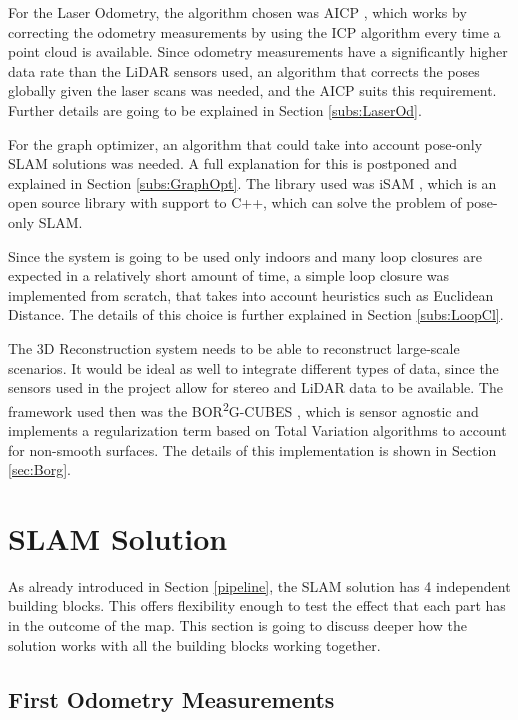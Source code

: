 \documentclass[12pt]{article}
\begin{document}
For the Laser Odometry, the algorithm chosen was AICP \cite{7989547}, which works by correcting the odometry measurements by using the ICP algorithm every time a point cloud is available. Since odometry measurements have a significantly higher data rate than the LiDAR sensors used, an algorithm that corrects the poses globally given the laser scans was needed, and the AICP suits this requirement. Further details are going to be explained in Section \ref{subs:LaserOd}.
	
For the graph optimizer, an algorithm that could take into account pose-only SLAM solutions was needed. A full explanation for this is postponed and explained in Section \ref{subs:GraphOpt}. The library used was iSAM \cite{Kaess08tro}, which is an open source library with support to C++, which can solve the problem of pose-only SLAM.
	
Since the system is going to be used only indoors and many loop closures are expected in a relatively short amount of time, a simple loop closure was implemented from scratch, that takes into account heuristics such as Euclidean Distance. The details of this choice is further explained in Section \ref{subs:LoopCl}.
	
The 3D Reconstruction system needs to be able to reconstruct large-scale scenarios. It would be ideal as well to integrate different types of data, since the sensors used in the project allow for stereo and LiDAR data to be available. The framework used then was the BOR\textsuperscript{2}G-CUBES \cite{TannerFSR2015}\cite{TannerArXiv2016}, which is sensor agnostic and implements a regularization term based on Total Variation algorithms to account for non-smooth surfaces. The details of this implementation is shown in Section \ref{sec:Borg}.
		
	\newpage
	\section{SLAM Solution}

As already introduced in Section \ref{pipeline}, the SLAM solution has 4 independent building blocks. This offers flexibility enough to test the effect that each part has in the outcome of the map. This section is going to discuss deeper how the solution works with all the building blocks working together. 
	 
	\subsection{First Odometry Measurements}
\end{document}
